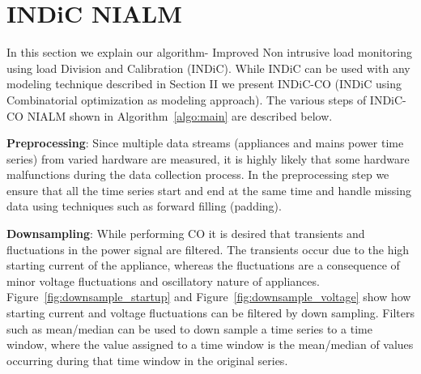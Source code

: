 \documentclass[conference]{IEEEtran}
\newcommand{\figref}[1]{Figure~\ref{#1}}
\newcommand{\algoref}[1]{Algorithm~\ref{#1}}
\begin{document}
\section{INDiC NIALM}
\noindent In this section we explain our algorithm- Improved Non intrusive load monitoring using load Division and Calibration (INDiC). While INDiC can be used with any modeling technique described in Section II we present INDiC-CO (INDiC using Combinatorial optimization as modeling approach). The various steps of INDiC-CO NIALM shown in \algoref{algo:main} are described below. 

\noindent\textbf{Preprocessing}: Since multiple data streams (appliances and mains power time series) from varied hardware are measured, it is highly likely that some hardware malfunctions during the data collection process. In the preprocessing step we ensure that all the time series start and end at the same time and handle missing data using techniques such as forward filling (padding).

\noindent\textbf{Downsampling}: While performing CO it is desired that transients and fluctuations in the power signal are filtered\cite{hart}. The transients occur due to the high starting current of the appliance, whereas the fluctuations are a consequence of minor voltage fluctuations and oscillatory nature of appliances. \figref{fig:downsample_startup} and \figref{fig:downsample_voltage} show how starting current and voltage fluctuations can be filtered by down sampling. Filters such as mean/median can be used to down sample a time series to a time window, where the value assigned to a time window is the mean/median of values occurring during that time window in the original series.
\end{document}
